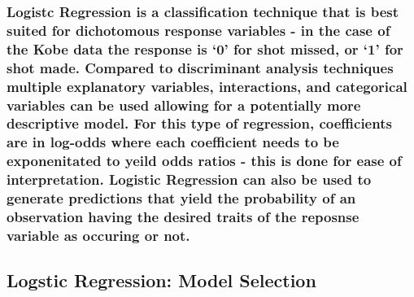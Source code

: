 \documentclass[american,]{article}
\begin{document}
\hypertarget{logistc-regression-is-a-classification-technique-that-is-best-suited-for-dichotomous-response-variables---in-the-case-of-the-kobe-data-the-response-is-0-for-shot-missed-or-1-for-shot-made.-compared-to-discriminant-analysis-techniques-multiple-explanatory-variables-interactions-and-categorical-variables-can-be-used-allowing-for-a-potentially-more-descriptive-model.-for-this-type-of-regression-coefficients-are-in-log-odds-where-each-coefficient-needs-to-be-exponenitated-to-yeild-odds-ratios---this-is-done-for-ease-of-interpretation.-logistic-regression-can-also-be-used-to-generate-predictions-that-yield-the-probability-of-an-observation-having-the-desired-traits-of-the-reposnse-variable-as-occuring-or-not.}{%
\subsubsection{Logistc Regression is a classification technique that is best suited for dichotomous response variables - in the case of the Kobe data the response is `0' for shot missed, or `1' for shot made. Compared to discriminant analysis techniques multiple explanatory variables, interactions, and categorical variables can be used allowing for a potentially more descriptive model. For this type of regression, coefficients are in log-odds where each coefficient needs to be exponenitated to yeild odds ratios - this is done for ease of interpretation. Logistic Regression can also be used to generate predictions that yield the probability of an observation having the desired traits of the reposnse variable as occuring or not.}\label{logistc-regression-is-a-classification-technique-that-is-best-suited-for-dichotomous-response-variables---in-the-case-of-the-kobe-data-the-response-is-0-for-shot-missed-or-1-for-shot-made.-compared-to-discriminant-analysis-techniques-multiple-explanatory-variables-interactions-and-categorical-variables-can-be-used-allowing-for-a-potentially-more-descriptive-model.-for-this-type-of-regression-coefficients-are-in-log-odds-where-each-coefficient-needs-to-be-exponenitated-to-yeild-odds-ratios---this-is-done-for-ease-of-interpretation.-logistic-regression-can-also-be-used-to-generate-predictions-that-yield-the-probability-of-an-observation-having-the-desired-traits-of-the-reposnse-variable-as-occuring-or-not.}}

\hypertarget{logstic-regression-model-selection}{%
\subsection{\texorpdfstring{\textbf{Logstic Regression: Model Selection}}{Logstic Regression: Model Selection}}\label{logstic-regression-model-selection}}
\end{document}
